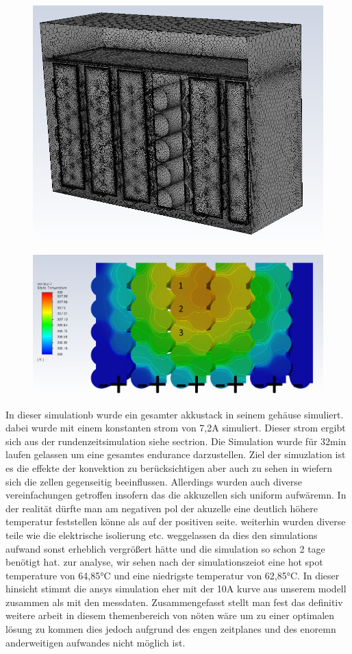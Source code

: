 \begin{figure}[h]
	\centering
	\includegraphics[width=0.7\linewidth]{bilder/Accu_Sim_therm_7_2A_45min_simple_mesh}
	\caption{}
	\label{fig:accusimtherm72a45minsimplemesh}
\end{figure}

\begin{figure}[h]
	\centering
	\includegraphics[width=0.7\linewidth]{bilder/Accu_Sim_therm_7_2A_45min_simple}
	\caption{}
	\label{fig:accusimtherm72a45minsimple}
\end{figure}

In dieser simulationb wurde ein gesamter akkustack in seinem gehäuse simuliert. dabei wurde mit einem konstanten strom von 7,2A simuliert. Dieser strom ergibt sich aus der rundenzeitsimulation siehe sectrion. Die Simulation wurde für 32min laufen gelassen um eine gesamtes endurance darzustellen. Ziel der simuzlation ist es die effekte der konvektion zu berücksichtigen aber auch zu sehen in wiefern sich die zellen gegenseitig beeinflussen. Allerdings wurden auch diverse vereinfachungen getroffen insofern das die akkuzellen sich uniform aufwäremn. In der realität dürfte man am negativen pol der akuzelle eine deutlich höhere temperatur feststellen könne als auf der positiven seite. weiterhin wurden diverse teile wie die elektrische isolierung etc. weggelassen da dies den simulations aufwand sonst erheblich vergrößert hätte und die simulation so schon 2 tage benötigt hat. zur analyse, wir sehen nach der simulationszeiot eine hot spot temperature von 64,85°C und eine niedrigste temperatur von 62,85°C. In dieser hinsicht stimmt die ansys simulation eher mit der 10A kurve aus unserem modell zusammen als mit den messdaten. Zusammengefasst stellt man fest das definitiv weitere arbeit in diesem themenbereich von nöten wäre um zu einer optimalen lösung zu kommen dies jedoch aufgrund des engen zeitplanes und des enoremn anderweitigen aufwandes nicht möglich ist.

